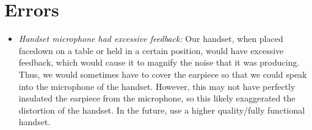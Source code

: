 \documentclass[10pt]{article}
\begin{document}
\section{Errors}


\medskip
\begin{itemize}
	\item \textit{Handset microphone had excessive feedback:} Our handset, when placed facedown on a table or held in a certain position, would have excessive feedback, which would cause it to magnify the noise that it was producing. Thus, we would sometimes have to cover the earpiece so that we could speak into the microphone of the handset. However, this may not have perfectly insulated the earpiece from the microphone, so this likely exaggerated the distortion of the handset. In the future, use a higher quality/fully functional handset. 
\end{itemize}
\end{document}
